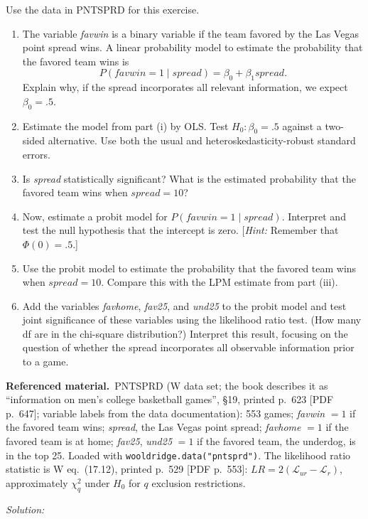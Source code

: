 \documentclass[11pt,a4paper]{article}
\newif\ifsolucoes
\newcommand{\espacoresol}{3.5cm}   %
\numberwithin{equation}{questao}   %
\newenvironment{refmat}{\par\smallskip\noindent\begin{small}\textbf{Referenced material.}\ }{\end{small}\par\smallskip}
\newcommand{\resolespaco}{\ifsolucoes\else\par\textit{Solution:}\vspace{\espacoresol}\par\fi}
\begin{document}
Use the data in PNTSPRD for this exercise.
\begin{enumerate}[label=(\roman*)]
\item The variable \textit{favwin} is a binary variable if the team favored by the Las Vegas point
spread wins. A linear probability model to estimate the probability that the favored team wins is
\[P(\textit{favwin}=1\mid\textit{spread})=\beta_0+\beta_1\textit{spread}.\]
Explain why, if the spread incorporates all relevant information, we expect $\beta_0=.5$.
\item Estimate the model from part (i) by OLS. Test $H_0\colon\beta_0=.5$ against a two-sided
alternative. Use both the usual and heteroskedasticity-robust standard errors.
\item Is \textit{spread} statistically significant? What is the estimated probability that the
favored team wins when $\textit{spread}=10$?
\item Now, estimate a probit model for $P(\textit{favwin}=1\mid\textit{spread})$. Interpret and test
the null hypothesis that the intercept is zero. [\textit{Hint:} Remember that $\Phi(0)=.5$.]
\item Use the probit model to estimate the probability that the favored team wins when
$\textit{spread}=10$. Compare this with the LPM estimate from part (iii).
\item Add the variables \textit{favhome}, \textit{fav25}, and \textit{und25} to the probit model and
test joint significance of these variables using the likelihood ratio test. (How many df are in
the chi-square distribution?) Interpret this result, focusing on the question of whether the
spread incorporates all observable information prior to a game.
\end{enumerate}
\begin{refmat}PNTSPRD (W data set; the book describes it as ``information on men's college basketball
games'', §19, printed p.~623 [PDF p.~647]; variable labels from the data documentation): 553 games;
\textit{favwin} $=1$ if the favored team wins; \textit{spread}, the Las Vegas point spread;
\textit{favhome} $=1$ if the favored team is at home; \textit{fav25}, \textit{und25} $=1$ if the favored
team, the underdog, is in the top 25. Loaded with \texttt{wooldridge.data("pntsprd")}. The likelihood
ratio statistic is W eq.~(17.12), printed p.~529 [PDF p.~553]: $LR=2(\mathcal L_{ur}-\mathcal L_r)$,
approximately $\chi^2_q$ under $H_0$ for $q$ exclusion restrictions.\end{refmat}
\resolespaco
\end{document}
